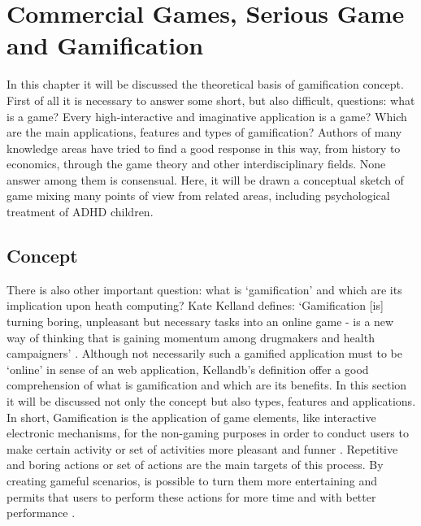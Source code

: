 \chapter{Commercial Games, Serious Game and Gamification}
\label{ch:gamification}


In this chapter it will be discussed the theoretical basis of gamification concept. First of all it is necessary to answer some short, but also difficult, questions: what is a game? Every high-interactive and imaginative application is a game? Which are the main applications, features and types of gamification? Authors of many knowledge areas have tried to find a good response in this way, from history to economics, through the game theory and other interdisciplinary fields. None answer among them is consensual. Here, it will be drawn a conceptual sketch of game mixing many points of view from related areas, including psychological treatment of ADHD children.


\section{Concept}

There is also other important question: what is `gamification' and which are its implication upon heath computing? Kate Kelland defines: `Gamification [is] turning boring, unpleasant but necessary tasks into an online game - is a new way of thinking that is gaining momentum among drugmakers and health campaigners' \citep{gamehealth}. Although not necessarily such a gamified application must to be `online' in sense of an web application, Kellandb's definition offer a good comprehension of what is gamification and which are its benefits. In this section it will be discussed not only the concept but also types, features and applications. In short, Gamification is the application of game elements, like interactive electronic mechanisms, for the non-gaming purposes in order to conduct users to make certain activity or set of activities more pleasant and funner \citep{2212883,Huotari,Zich}. Repetitive and boring actions or set of actions are the main targets of this process. By creating gameful scenarios, is possible to turn them more entertaining and permits that users to perform these actions for more time and with better performance  \citep{2212883,Huotari}. 

